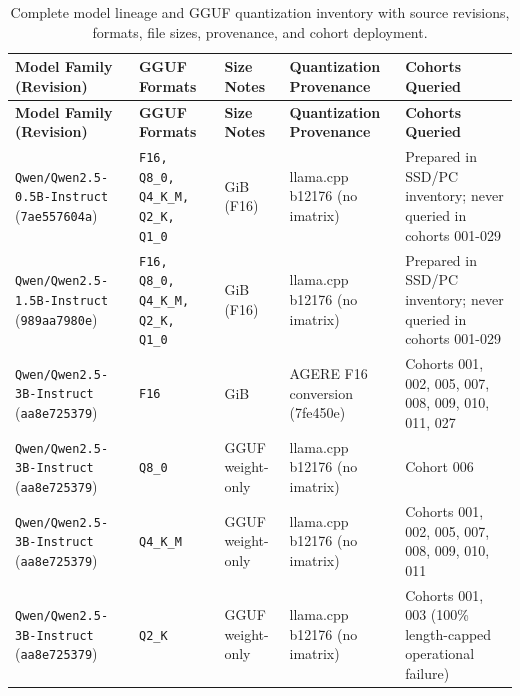 {\footnotesize
\setlength{\tabcolsep}{3.5pt}
\begin{longtable}{@{}>{\raggedright\arraybackslash}p{3.0cm}>{\raggedright\arraybackslash}p{2.3cm}>{\raggedright\arraybackslash}p{2.2cm}>{\raggedright\arraybackslash}p{3.4cm}>{\raggedright\arraybackslash}p{3.6cm}@{}}
\caption{Complete model lineage and GGUF quantization inventory with source revisions, formats, file sizes, provenance, and cohort deployment.}\label{tab:model_quant_inventory}\\
\toprule
\textbf{Model Family (Revision)} & \textbf{GGUF Formats} & \textbf{Size Notes} & \textbf{Quantization Provenance} & \textbf{Cohorts Queried} \\
\midrule
\endfirsthead
\toprule
\textbf{Model Family (Revision)} & \textbf{GGUF Formats} & \textbf{Size Notes} & \textbf{Quantization Provenance} & \textbf{Cohorts Queried} \\
\midrule
\endhead
\bottomrule
\endfoot
\texttt{Qwen/\allowbreak{}Qwen2.5-\allowbreak{}0.5B-\allowbreak{}Instruct} (\texttt{7ae557604a}) & \texttt{F16, Q8\_0, Q4\_K\_M, Q2\_K, Q1\_0} & 0.926 GiB (F16) & llama.cpp b12176 (no imatrix) & Prepared in SSD/\allowbreak{}PC inventory; never queried in cohorts 001-\allowbreak{}029 \\[2pt]
\texttt{Qwen/\allowbreak{}Qwen2.5-\allowbreak{}1.5B-\allowbreak{}Instruct} (\texttt{989aa7980e}) & \texttt{F16, Q8\_0, Q4\_K\_M, Q2\_K, Q1\_0} & 2.881 GiB (F16) & llama.cpp b12176 (no imatrix) & Prepared in SSD/\allowbreak{}PC inventory; never queried in cohorts 001-\allowbreak{}029 \\[2pt]
\texttt{Qwen/\allowbreak{}Qwen2.5-\allowbreak{}3B-\allowbreak{}Instruct} (\texttt{aa8e725379}) & \texttt{F16} & 5.754 GiB & AGERE F16 conversion (7fe450e) & Cohorts 001, 002, 005, 007, 008, 009, 010, 011, 027 \\[2pt]
\texttt{Qwen/\allowbreak{}Qwen2.5-\allowbreak{}3B-\allowbreak{}Instruct} (\texttt{aa8e725379}) & \texttt{Q8\_0} & GGUF weight-\allowbreak{}only & llama.cpp b12176 (no imatrix) & Cohort 006 \\[2pt]
\texttt{Qwen/\allowbreak{}Qwen2.5-\allowbreak{}3B-\allowbreak{}Instruct} (\texttt{aa8e725379}) & \texttt{Q4\_K\_M} & GGUF weight-\allowbreak{}only & llama.cpp b12176 (no imatrix) & Cohorts 001, 002, 005, 007, 008, 009, 010, 011 \\[2pt]
\texttt{Qwen/\allowbreak{}Qwen2.5-\allowbreak{}3B-\allowbreak{}Instruct} (\texttt{aa8e725379}) & \texttt{Q2\_K} & GGUF weight-\allowbreak{}only & llama.cpp b12176 (no imatrix) & Cohorts 001, 003 (100\% length-\allowbreak{}capped operational failure) \\[2pt]

\end{longtable}}
